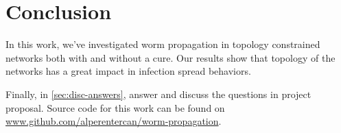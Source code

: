 \documentclass[conference]{IEEEtran}
\begin{document}
\section{Conclusion}

In this work, we've investigated worm propagation in topology constrained networks both with and without a cure. Our results show that topology of the networks has a great impact in infection spread behaviors.

Finally, in \autoref{sec:disc-answers}, answer and discuss the questions in project proposal. Source code for this work can be found on \url{www.github.com/alperentercan/worm-propagation}.





\end{document}
